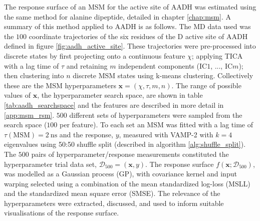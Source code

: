 The response surface of an MSM for the active site of AADH was estimated using the same method for alanine dipeptide, detailed in chapter \ref{chap:msm}. A summary of this method applied to AADH is as follows. The MD data used was the $100$ coordinate trajectories of the six residues of the D active site of AADH defined in figure \ref{fig:aadh_active_site}. These trajectories were pre-processed into discrete states by first projecting onto a continuous feature $\chi$; applying TICA with a lag time of $\tau$ and retaining $m$ independent components (IC$1$, ..., IC$m$);  then clustering into $n$ discrete MSM states using k-means clustering. Collectively these are the MSM hyperparameters $\mathbf{x} = (\chi, \tau, m, n)$. The range of possible values of $\mathbf{x}$, the hyperparameter search space, are shown in table \ref{tab:aadh_searchspace} and the features are described in more detail in \ref{app:msm_rsm}. $500$ different sets of hyperparameters were sampled from the search space ($100$ per feature). To each set an MSM was fitted with a lag time of $\tau(\mathrm{MSM}) = \SI{2}{\nano\second}$ and the response, $y$, measured with VAMP-2 with $k=4$ eigenvalues using 50:50 shuffle split (described in algorithm \ref{alg:shuffle_split}). The $500$ pairs of hyperparameter/response measurements  constituted the hyperparameter trial data set, $\mathcal{D}_{500} = (\mathbf{x}, y)$. The response surface $f(\mathbf{x}; \mathcal{D}_{500})$, was modelled as a Gaussian process (GP), with covariance kernel and input warping selected using a combination of the mean standardized log-loss (MSLL) and the standardized mean square error (SMSE). The relevance of the hyperparameters were extracted, discussed, and used to inform suitable visualisations of the response surface.

